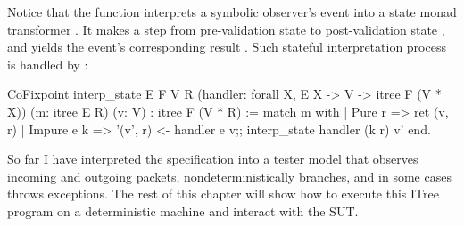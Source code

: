 Notice that the  function interprets a symbolic observer's event
 into a state monad transformer .  It
makes a step from pre-validation state  to post-validation state
, and yields the event's corresponding result .  Such
stateful interpretation process is handled by :
\begin{coq}
  CoFixpoint interp_state {E F V R}
                          (handler: forall {X}, E X -> V -> itree F (V * X))
                          (m: itree E R) (v: V)
             : itree F (V * R) :=
    match m with
    | Pure   r   => ret (v, r)
    | Impure e k => '(v', r) <- handler e v;;
                    interp_state handler (k r) v'
    end.
\end{coq}

So far I have interpreted the specification into a tester model that observes
incoming and outgoing packets, nondeterministically branches, and in some cases
throws exceptions.  The rest of this chapter will show how to execute this ITree
program on a deterministic machine and interact with the SUT.
